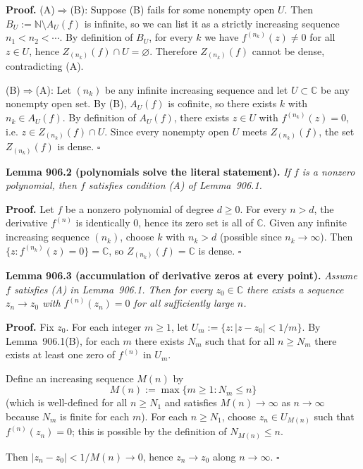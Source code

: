 \noindent\textbf{Proof.}
(A)$\Rightarrow$(B): Suppose (B) fails for some nonempty open $U$. Then $B_U:=\mathbb{N}\setminus A_U(f)$ is infinite, so we can list it as a strictly increasing sequence $n_1<n_2<\cdots$. By definition of $B_U$, for every $k$ we have $f^{(n_k)}(z)\ne 0$ for all $z\in U$, hence $Z_{(n_k)}(f)\cap U=\varnothing$. Therefore $Z_{(n_k)}(f)$ cannot be dense, contradicting (A).

(B)$\Rightarrow$(A): Let $(n_k)$ be any infinite increasing sequence and let $U\subset\mathbb{C}$ be any nonempty open set. By (B), $A_U(f)$ is cofinite, so there exists $k$ with $n_k\in A_U(f)$. By definition of $A_U(f)$, there exists $z\in U$ with $f^{(n_k)}(z)=0$, i.e. $z\in Z_{(n_k)}(f)\cap U$. Since every nonempty open $U$ meets $Z_{(n_k)}(f)$, the set $Z_{(n_k)}(f)$ is dense. \hfill$\square$

\medskip
\noindent\textbf{Lemma 906.2 (polynomials solve the literal statement).}  \emph{If $f$ is a nonzero polynomial, then $f$ satisfies condition (A) of Lemma~906.1.}

\noindent\textbf{Proof.} Let $f$ be a nonzero polynomial of degree $d\ge 0$. For every $n>d$, the derivative $f^{(n)}$ is identically $0$, hence its zero set is all of $\mathbb{C}$. Given any infinite increasing sequence $(n_k)$, choose $k$ with $n_k>d$ (possible since $n_k\to\infty$). Then $\{z: f^{(n_k)}(z)=0\}=\mathbb{C}$, so $Z_{(n_k)}(f)=\mathbb{C}$ is dense. \hfill$\square$

\medskip
\noindent\textbf{Lemma 906.3 (accumulation of derivative zeros at every point).}  \emph{Assume $f$ satisfies (A) in Lemma~906.1. Then for every $z_0\in\mathbb{C}$ there exists a sequence $z_n\to z_0$ with $f^{(n)}(z_n)=0$ for all sufficiently large $n$.}

\noindent\textbf{Proof.} Fix $z_0$. For each integer $m\ge 1$, let $U_m:=\{z:|z-z_0|<1/m\}$. By Lemma~906.1(B), for each $m$ there exists $N_m$ such that for all $n\ge N_m$ there exists at least one zero of $f^{(n)}$ in $U_m$.

Define an increasing sequence $M(n)$ by
\[
M(n):=\max\{m\ge 1: N_m\le n\}
\]
(which is well-defined for all $n\ge N_1$ and satisfies $M(n)\to\infty$ as $n\to\infty$ because $N_m$ is finite for each $m$). For each $n\ge N_1$, choose $z_n\in U_{M(n)}$ such that $f^{(n)}(z_n)=0$; this is possible by the definition of $N_{M(n)}\le n$.

Then $|z_n-z_0|<1/M(n)\to 0$, hence $z_n\to z_0$ along $n\to\infty$. \hfill$\square$

